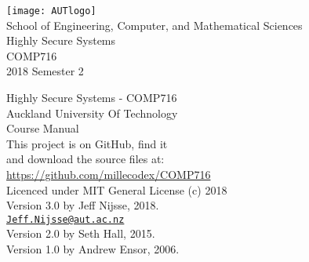 \documentclass[a4paper,oneside]{book}
\begin{document}
 \frontmatter
 \begin{titlepage}
 	\begin{center}
 		
 		\texttt{[image: AUTlogo]}\\
 		{\vspace{2cm}}
 		{\Large School of Engineering, Computer, and Mathematical Sciences}
 		\vspace{3cm}\\
 		{\huge Highly Secure Systems}\\
 		\vspace{1cm}
 		{\huge COMP716} \\
 		\vspace{1cm}
 		{\huge 2018 Semester 2} \\
 		\vfill
 	\end{center}
 \end{titlepage}
 
 \clearpage\thispagestyle{empty}
   \vspace*{\fill}
 Highly Secure Systems - COMP716\\
 Auckland University Of Technology\\
 Course Manual\\
 
 This project is on GitHub, find it \\
 and download the source files at: \\
 \url{https://github.com/millecodex/COMP716} \\                            
                                                                      
 Licenced under MIT General License (c) 2018 \\     
 
 Version 3.0 by Jeff Nijsse, 2018.\\
\href{mailto:Jeff.Nijsse@aut.ac.nz}{\texttt{Jeff.Nijsse@aut.ac.nz}}\\
 Version 2.0 by Seth Hall, 2015.\\
 Version 1.0 by Andrew Ensor, 2006.
 
 
    
    
    \tableofcontents

  \mainmatter
    
    
    
    
    
	

  \appendix
\end{document}
